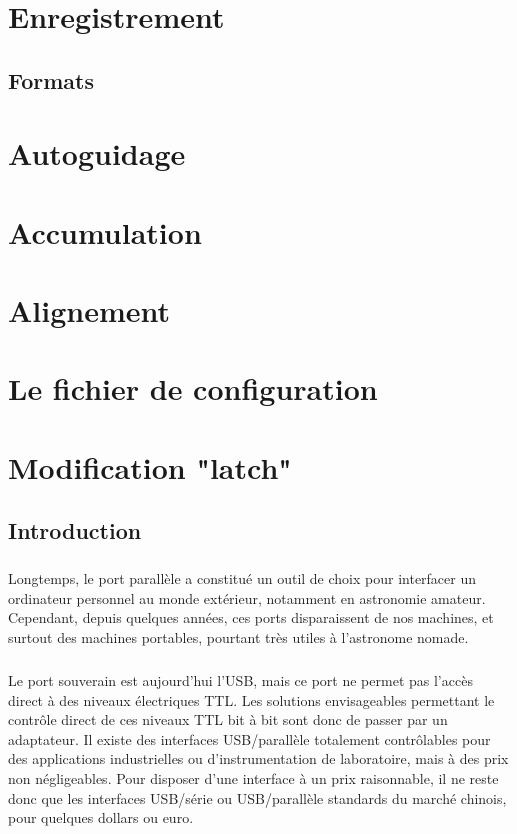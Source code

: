 \documentclass[11pt,a4paper]{book}
\begin{document}
\chapter{Enregistrement}

\section*{Formats}

\chapter{Autoguidage}

\chapter{Accumulation}

\chapter{Alignement}

\chapter{Le fichier de configuration}

\appendix

\chapter{Modification "latch"}

\section*{Introduction}

\paragraph*{}
Longtemps, le port parall\`ele a constitu\'e un outil de choix pour
interfacer un ordinateur personnel au monde ext\'erieur, notamment en
astronomie amateur. Cependant, depuis quelques années, ces ports
disparaissent de nos machines, et surtout des machines portables,
pourtant tr\`es utiles \`a l'astronome nomade.

\paragraph*{}
Le port souverain est aujourd'hui l'USB, mais ce port ne permet pas l'acc\`es
 direct \`a des niveaux \'electriques TTL. Les solutions envisageables
permettant le contr\^ole direct de ces niveaux TTL bit \`a bit sont donc de
passer par un adaptateur. Il existe des interfaces USB/parall\`ele totalement
contr\^olables pour des applications industrielles ou d'instrumentation de 
laboratoire, mais \`a des prix non n\'egligeables. Pour disposer d'une 
interface \`a un prix raisonnable, il ne reste donc que les interfaces USB/s\'erie 
ou USB/parall\`ele standards du march\'e chinois, pour quelques dollars ou euro.
\end{document}
